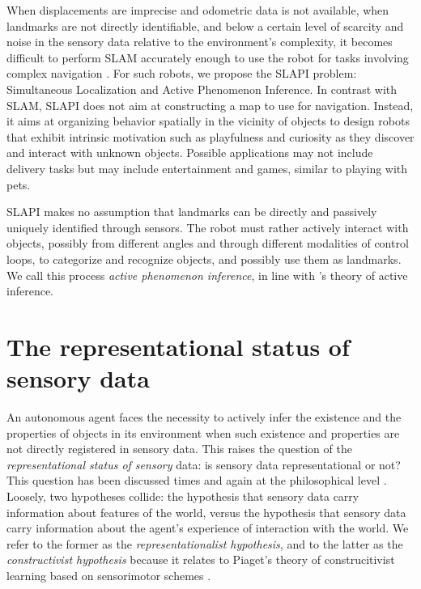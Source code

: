 \documentclass[pmlr]{jmlr}%
\begin{document}
When displacements are imprecise and odometric data is not available, when landmarks are not directly identifiable, and below a certain level of scarcity and noise in the sensory data relative to the environment’s complexity, it becomes difficult to perform SLAM accurately enough to use the robot for tasks involving complex navigation \citep{gay_towards_2021}. 
For such robots, we propose the SLAPI problem:  Simultaneous Localization and Active Phenomenon Inference.
In contrast with SLAM, SLAPI does not aim at constructing a map to use for navigation. 
Instead, it aims at organizing behavior spatially in the vicinity of objects to design robots that exhibit intrinsic motivation \citep[e.g.,][]{oudeyer_intrinsic_2007} such as playfulness and curiosity as they discover and interact with unknown objects. 
Possible applications may not include delivery tasks but may include entertainment and games, similar to playing with pets. 

SLAPI makes no assumption that landmarks can be directly and passively uniquely identified through sensors. 
The robot must rather actively interact with objects, possibly from different angles and through different modalities of control loops, to categorize and recognize objects, and possibly use them as landmarks. 
We call this process \textit{active phenomenon inference}, in line with \cite{friston_world_2021}'s theory of active inference. 


\section{The representational status of sensory data}
\label{sec:input}

An autonomous agent faces the necessity to actively infer the existence and the properties of objects in its environment when such existence and properties are not directly registered in sensory data. 
This raises the question of the \textit{representational status of sensory} data: is sensory data representational or not? 
This question has been discussed times and again at the philosophical level \citep[e.g.,][]{williford_husserls_2013}.
Loosely, two hypotheses collide: the hypothesis that sensory data carry information about features of the world, versus the hypothesis that sensory data carry information about the agent's experience of interaction with the world. 
We refer to the former as the \textit{representationalist hypothesis}, and to the latter as the \textit{constructivist hypothesis} because it relates to Piaget's theory of construcitivist learning based on sensorimotor schemes \citep{guillermin_artificial_2022}. 
\end{document}
